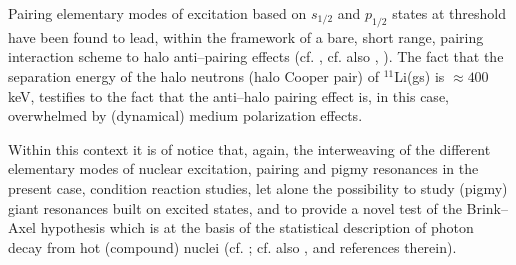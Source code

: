   
   
 Pairing elementary modes of excitation based on $s_{1/2}$ and $p_{1/2}$ states at threshold have been found to lead, within the framework of a bare, short range, pairing interaction scheme to halo anti--pairing effects (cf. \citet{Bennaceur:00}, cf. also \citet{Hamamoto:03}, \citet{Hamamoto:04}). The fact that the separation energy of the halo neutrons (halo Cooper pair) of $^{11}$Li(gs) is $\approx 400$keV, testifies to the fact that the anti--halo pairing effect is, in this case, overwhelmed by (dynamical) medium polarization effects.
 
 Within this context it is of notice that, again, the interweaving of the different elementary modes of nuclear excitation, pairing and pigmy resonances in the present case, condition reaction studies, let alone the possibility to study (pigmy) giant resonances built on excited states, and to provide a novel test of the Brink--Axel hypothesis which is at the basis of the statistical description of photon decay from hot (compound) nuclei (cf. \citet{Brink:55}; cf. also \citet{Bortignon:98}, \cite{Bertsch:86} and references therein). 
 
